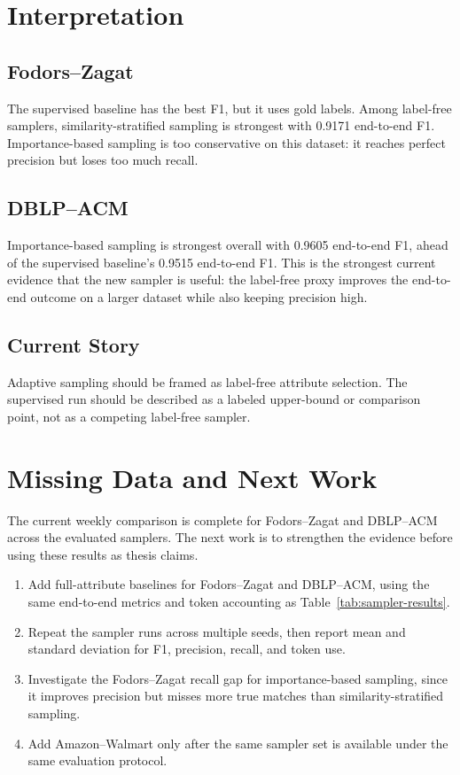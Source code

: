\documentclass[11pt]{article}
\begin{document}
\section{Interpretation}

\subsection{Fodors--Zagat}

The supervised baseline has the best F1, but it uses gold labels. Among label-free samplers, similarity-stratified sampling is strongest with 0.9171 end-to-end F1. Importance-based sampling is too conservative on this dataset: it reaches perfect precision but loses too much recall.

\subsection{DBLP--ACM}

Importance-based sampling is strongest overall with 0.9605 end-to-end F1, ahead of the supervised baseline's 0.9515 end-to-end F1. This is the strongest current evidence that the new sampler is useful: the label-free proxy improves the end-to-end outcome on a larger dataset while also keeping precision high.

\subsection{Current Story}

Adaptive sampling should be framed as label-free attribute selection. The supervised run should be described as a labeled upper-bound or comparison point, not as a competing label-free sampler.

\section{Missing Data and Next Work}

The current weekly comparison is complete for Fodors--Zagat and DBLP--ACM across the evaluated samplers. The next work is to strengthen the evidence before using these results as thesis claims.

\begin{enumerate}
    \item Add full-attribute baselines for Fodors--Zagat and DBLP--ACM, using the same end-to-end metrics and token accounting as Table~\ref{tab:sampler-results}.
    \item Repeat the sampler runs across multiple seeds, then report mean and standard deviation for F1, precision, recall, and token use.
    \item Investigate the Fodors--Zagat recall gap for importance-based sampling, since it improves precision but misses more true matches than similarity-stratified sampling.
    \item Add Amazon--Walmart only after the same sampler set is available under the same evaluation protocol.
\end{enumerate}
\end{document}
